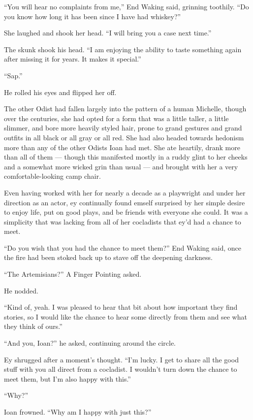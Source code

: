 ``You will hear no complaints from me,'' End Waking said, grinning toothily. ``Do you know how long it has been since I have had whiskey?''

She laughed and shook her head. ``I will bring you a case next time.''

The skunk shook his head. ``I am enjoying the ability to taste something again after missing it for years. It makes it special.''

``Sap.''

He rolled his eyes and flipped her off.

The other Odist had fallen largely into the pattern of a human Michelle, though over the centuries, she had opted for a form that was a little taller, a little slimmer, and bore more heavily styled hair, prone to grand gestures and grand outfits in all black or all gray or all red. She had also headed towards hedonism more than any of the other Odists Ioan had met. She ate heartily, drank more than all of them — though this manifested mostly in a ruddy glint to her cheeks and a somewhat more wicked grin than usual — and brought with her a very comfortable-looking camp chair.

Even having worked with her for nearly a decade as a playwright and under her direction as an actor, ey continually found emself surprised by her simple desire to enjoy life, put on good plays, and be friends with everyone she could. It was a simplicity that was lacking from all of her cocladists that ey'd had a chance to meet.

``Do you wish that you had the chance to meet them?'' End Waking said, once the fire had been stoked back up to stave off the deepening darkness.

``The Artemisians?'' A Finger Pointing asked.

He nodded.

``Kind of, yeah. I was pleased to hear that bit about how important they find stories, so I would like the chance to hear some directly from them and see what they think of ours.''

``And you, Ioan?'' he asked, continuing around the circle.

Ey shrugged after a moment's thought. ``I'm lucky. I get to share all the good stuff with you all direct from a cocladist. I wouldn't turn down the chance to meet them, but I'm also happy with this.''

``Why?''

Ioan frowned. ``Why am I happy with just this?''

